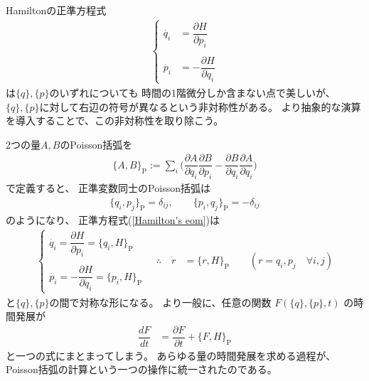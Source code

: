 Hamiltonの正準方程式
\begin{align}
   \begin{cases}
      \dot{q_i} &= \dfrac{\partial H}{\partial p_i}
    \\\\
      \dot{p_i} &= - \dfrac{\partial H}{\partial q_i}
    \end{cases}
\label{Hamilton's eom}
\end{align}
は$\{q\},\{p\}$のいずれについても
時間の1階微分しか含まない点で美しいが、
$\{q\},\{p\}$に対して右辺の符号が異なるという非対称性がある。
より抽象的な演算を導入することで、この非対称性を取り除こう。

2つの量$A,B$のPoisson括弧を
\begin{align}
    \{A, B\}_{ \mathrm{P} }
    := \sum_i \bigg(
        \dfrac{ \partial A }{ \partial q_i }
        \dfrac{ \partial B }{ \partial p_i }
    -
        \dfrac{ \partial B }{ \partial q_i }
        \dfrac{ \partial A }{ \partial q_i }
    \bigg)
\end{align}
で定義すると、
正準変数同士のPoisson括弧は
\begin{align}
   \{q_i, p_j\}_{ \mathrm{P} }
   = \delta_{ij}
,\qquad
   \{p_i, q_j\}_{ \mathrm{P} }
   = - \delta_{ij}
\end{align}
のようになり、
正準方程式(\ref{Hamilton's eom})は
\begin{align}
    \begin{cases}
        \dot{q_i} 
        = \dfrac{\partial H}{\partial p_i}
        = \{q_i, H\}_{ \mathrm{P} }
      \\
      \\
        \dot{p_i} 
        = - \dfrac{\partial H}{\partial q_i}
        = \{p_i, H\}_{ \mathrm{P} }
      \end{cases}
\quad
\therefore
\quad
    \dot{r} &= \{r, H\}_{ \mathrm{P} }
\qquad
    ( r = q_i, p_j \quad\forall i, j )
\label{Hamilton e.o.m. in Poisson bracket}
\end{align}
と$\{q\},\{p\}$の間で対称な形になる。
より一般に、任意の関数
$F( \{q\},\{p\} , t )$
の時間発展が
\begin{align}
    \dfrac{ d F }{ dt } &= \dfrac{ \partial F }{ \partial t } + \{F, H\}_{ \mathrm{P} }
\label{time evolution in Poisson bracket}
\end{align}
と一つの式にまとまってしまう。
あらゆる量の時間発展を求める過程が、
Poisson括弧の計算という一つの操作に統一されたのである。
